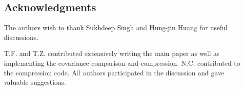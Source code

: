 \documentclass[twocolumn]{\docclass}
\begin{document}
	\subsection*{Acknowledgments}
	
	The authors wish to thank Sukhdeep Singh and Hung-jin Huang for useful discussions.
	
	
	
	 
	
	T.F. and T.Z. contributed extensively writing the main paper as well as implementing the covariance comparison and compression. N.C. contributed to the compression code. All authors participated in the discussion and gave valuable suggestions.
	
	
	
	
	
	
	
	
	
	
	
	
	
\end{document}
